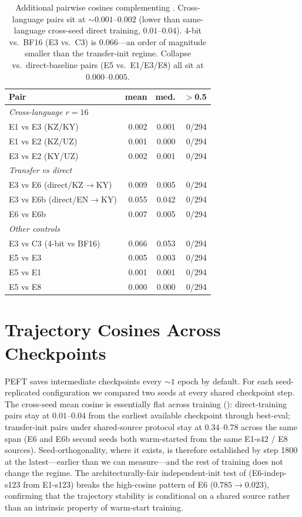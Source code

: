 \documentclass[11pt]{article}
\begin{document}
\begin{table}[!htbp]
\centering
\footnotesize
\setlength{\tabcolsep}{3pt}
\begin{tabular}{lrrr}
\toprule
\textbf{Pair} & \textbf{mean} & \textbf{med.} & \textbf{$>$0.5} \\
\midrule
\multicolumn{4}{l}{\emph{Cross-language $r{=}16$}}\\
E1 vs E3 (KZ/KY) & 0.002 & 0.001 & 0/294\\
E1 vs E2 (KZ/UZ) & 0.001 & 0.000 & 0/294\\
E3 vs E2 (KY/UZ) & 0.002 & 0.001 & 0/294\\
\midrule
\multicolumn{4}{l}{\emph{Transfer vs direct}}\\
E3 vs E6  (direct/KZ$\rightarrow$KY) & 0.009 & 0.005 & 0/294\\
E3 vs E6b (direct/EN$\rightarrow$KY) & 0.055 & 0.042 & 0/294\\
E6 vs E6b & 0.007 & 0.005 & 0/294\\
\midrule
\multicolumn{4}{l}{\emph{Other controls}}\\
E3 vs C3 (4-bit vs BF16)   & 0.066 & 0.053 & 0/294\\
E5 vs E3 & 0.005 & 0.003 & 0/294\\
E5 vs E1 & 0.001 & 0.001 & 0/294\\
E5 vs E8 & 0.000 & 0.000 & 0/294\\
\bottomrule
\end{tabular}
\caption{Additional pairwise cosines complementing . Cross-language pairs sit at $\sim 0.001$--$0.002$ (lower than same-language cross-seed direct training, $0.01$--$0.04$). 4-bit vs.\ BF16 (E3 vs.\ C3) is $0.066$---an order of magnitude smaller than the transfer-init regime. Collapse vs.\ direct-baseline pairs (E5 vs.\ E1/E3/E8) all sit at $0.000$--$0.005$.}
\label{tab:pairwise_cos_extra}
\end{table}

\section{Trajectory Cosines Across Checkpoints}
\label{app:trajectory}

PEFT saves intermediate checkpoints every $\sim 1$ epoch by default. For each seed-replicated configuration we compared two seeds at every shared checkpoint step. The cross-seed mean cosine is essentially flat across training (): direct-training pairs stay at $0.01$--$0.04$ from the earliest available checkpoint through best-eval; transfer-init pairs under shared-source protocol stay at $0.34$--$0.78$ across the same span (E6 and E6b second seeds both warm-started from the same E1-s42 / E8 sources). Seed-orthogonality, where it exists, is therefore established by step 1800 at the latest---earlier than we can measure---and the rest of training does not change the regime. The architecturally-fair independent-init test of  (E6-indep-s123 from E1-s123) breaks the high-cosine pattern of E6 ($0.785 \to 0.023$), confirming that the trajectory stability is conditional on a shared source rather than an intrinsic property of warm-start training.
\end{document}
